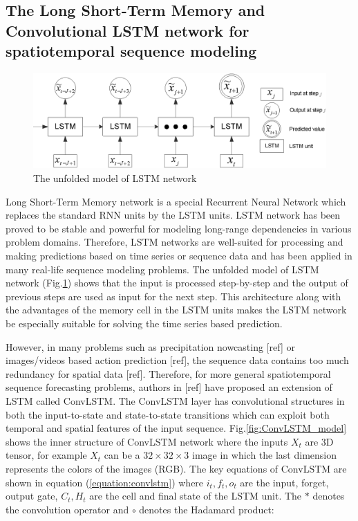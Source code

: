 \subsection{The Long Short-Term Memory and Convolutional LSTM network for spatiotemporal sequence modeling}
\label{subsection:lstm_ConvLSTM}
\begin{figure}
\centering
		\includegraphics[width=0.9\columnwidth]{preliminaries_figs/LSTM_model.eps}
		\caption{The unfolded model of LSTM network \label{fig:LSTM_model}}
\end{figure}


Long Short-Term Memory network is a special Recurrent Neural Network which replaces the standard RNN units by the LSTM units.
LSTM network has been proved to be stable and powerful for modeling long-range dependencies in various problem domains. 
Therefore, LSTM networks are well-suited for processing and making predictions based on time series or sequence data and has been applied in many real-life sequence modeling problems. 
The unfolded model of LSTM network (Fig.\ref{fig:LSTM_model}) shows that the input is processed step-by-step and the output of previous steps are used as input for the next step. 
This architecture along with the advantages of the memory cell in the LSTM units makes the LSTM network be especially suitable for solving the time series based prediction.

However, in many problems such as precipitation nowcasting [ref] or images/videos based action prediction [ref], the sequence data contains too much redundancy for spatial data [ref]. Therefore, for more general spatiotemporal sequence forecasting problems, authors in [ref] have proposed an extension of LSTM called ConvLSTM. The ConvLSTM layer has convolutional structures in both the input-to-state and state-to-state transitions which can exploit both temporal and spatial features of the input sequence. Fig.\ref{fig:ConvLSTM_model} shows the inner structure of ConvLSTM network where the inputs $X_t$ are 3D tensor, for example $X_t$ can be a $32 \times 32 \times 3$ image in which the last dimension represents the colors of the images (RGB). The key equations of ConvLSTM are shown in equation (\ref{equation:convlstm}) where $i_t, f_t, o_t$ are the input, forget, output gate, $C_t, H_t$ are the cell and final state of the LSTM unit. The $*$ denotes the convolution operator and $\circ$ denotes the Hadamard product:

